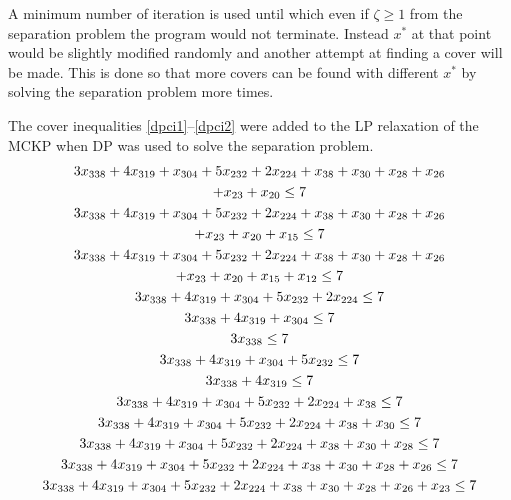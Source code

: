 \documentclass[10pt]{article}
\begin{document}
    A minimum number of iteration is used until which even if $\zeta \geq 1$ from the separation problem the program
    would not terminate. Instead $x^*$ at that point would be slightly modified randomly and another attempt at finding a
    cover will be made. This is done so that more covers can be found with different $x^*$ by solving the separation
    problem more times. 
    
    The cover inequalities \cref{dpci1}--\cref{dpci2} were added to the LP relaxation of the MCKP when DP was used to solve the
    separation problem.
    \begin{gather}
        3x_{338} + 4x_{319} + x_{304} + 5x_{232} + 2x_{224} + x_{38} + x_{30} + x_{28} + x_{26} \notag \\ + x_{23} + x_{20} \leq 7 \label{dpci1} \\
        3x_{338} + 4x_{319} + x_{304} + 5x_{232} + 2x_{224} + x_{38} + x_{30} + x_{28} + x_{26} \notag \\ + x_{23} + x_{20} + x_{15} \leq 7 \\
        3x_{338} + 4x_{319} + x_{304} + 5x_{232} + 2x_{224} + x_{38} + x_{30} + x_{28} + x_{26} \notag \\ + x_{23} + x_{20} + x_{15} + x_{12} \leq 7 \\
        3x_{338} + 4x_{319} + x_{304} + 5x_{232} + 2x_{224} \leq 7 \\
        3x_{338} + 4x_{319} + x_{304} \leq 7 \\
        3x_{338} \leq 7 \\
        3x_{338} + 4x_{319} + x_{304} + 5x_{232} \leq 7 \\
        3x_{338} + 4x_{319} \leq 7 \\
        3x_{338} + 4x_{319} + x_{304} + 5x_{232} + 2x_{224} + x_{38} \leq 7 \\
        3x_{338} + 4x_{319} + x_{304} + 5x_{232} + 2x_{224} + x_{38} + x_{30} \leq 7 \\
        3x_{338} + 4x_{319} + x_{304} + 5x_{232} + 2x_{224} + x_{38} + x_{30} + x_{28} \leq 7 \\
        3x_{338} + 4x_{319} + x_{304} + 5x_{232} + 2x_{224} + x_{38} + x_{30} + x_{28} + x_{26} \leq 7 \\
        3x_{338} + 4x_{319} + x_{304} + 5x_{232} + 2x_{224} + x_{38} + x_{30} + x_{28} + x_{26} + x_{23} \leq 7 \label{dpci2}
    \end{gather}
\end{document}
